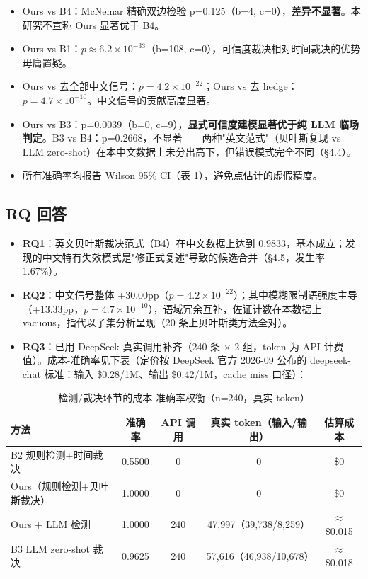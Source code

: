 \documentclass{article}
\begin{document}
\begin{itemize}
\item Ours vs B4：McNemar 精确双边检验 p=0.125（b=4, c=0），\textbf{差异不显著}。本研究不宣称 Ours 显著优于 B4。
\item Ours vs B1：$p\approx 6.2\times 10^{-33}$（b=108, c=0），可信度裁决相对时间裁决的优势毋庸置疑。
\item Ours vs 去全部中文信号：$p=4.2\times 10^{-22}$；Ours vs 去 hedge：$p=4.7\times 10^{-10}$。中文信号的贡献高度显著。
\item Ours vs B3：p=0.0039（b=0, c=9），\textbf{显式可信度建模显著优于纯 LLM 临场判定}。B3 vs B4：p=0.2668，不显著——两种"英文范式"（贝叶斯复现 vs LLM zero-shot）在本中文数据上未分出高下，但错误模式完全不同（§4.4）。
\item 所有准确率均报告 Wilson 95\% CI（表 1），避免点估计的虚假精度。
\end{itemize}

\subsection{RQ 回答}

\begin{itemize}
\item \textbf{RQ1}：英文贝叶斯裁决范式（B4）在中文数据上达到 0.9833，基本成立；发现的中文特有失效模式是"修正式复述"导致的候选合并（§4.5，发生率 1.67\%）。
\item \textbf{RQ2}：中文信号整体 +30.00pp（$p=4.2\times 10^{-22}$）；其中模糊限制语强度主导（+13.33pp，$p=4.7\times 10^{-10}$），语域冗余互补，佐证计数在本数据上 vacuous，指代以子集分析呈现（20 条上贝叶斯类方法全对）。
\item \textbf{RQ3}：已用 DeepSeek 真实调用补齐（240 条 $\times$ 2 组，token 为 API 计费值）。成本-准确率见下表（定价按 DeepSeek 官方 2026-09 公布的 deepseek-chat 标准：输入 \$0.28/1M、输出 \$0.42/1M，cache miss 口径）：
\end{itemize}

\begin{table}[t]
\centering
{\small
\begin{tabular}{lcccc}
\toprule
方法 & 准确率 & API 调用 & 真实 token（输入/输出） & 估算成本 \\
\midrule
B2 规则检测+时间裁决 & 0.5500 & 0 & 0 & \$0 \\
Ours（规则检测+贝叶斯裁决） & 1.0000 & 0 & 0 & \$0 \\
Ours + LLM 检测 & 1.0000 & 240 & 47,997（39,738/8,259） & $\approx$\$0.015 \\
B3 LLM zero-shot 裁决 & 0.9625 & 240 & 57,616（46,938/10,678） & $\approx$\$0.018 \\
\bottomrule
\end{tabular}
}
\caption{检测/裁决环节的成本-准确率权衡（n=240，真实 token）}
\label{tab:cost}
\end{table}
\end{document}
